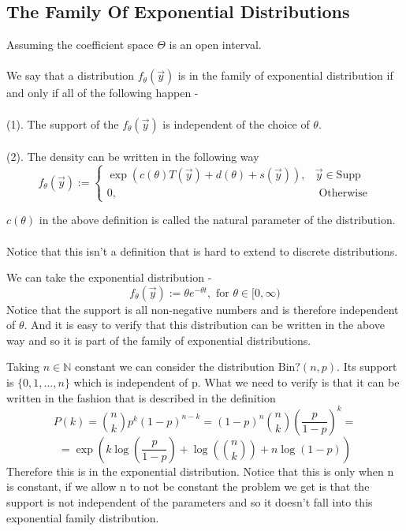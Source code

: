 \documentclass[../main.tex]{subfiles}
\begin{document}
\subsection{The Family Of Exponential Distributions}
\begin{definition}
Assuming the coefficient space $\Theta$ is an open interval. \\\\
We say that a distribution $f_\theta(\overrightarrow{y})$ is in the family of exponential distribution if and only if all of the following happen - \\\\
(1). The support of the $f_\theta(\overrightarrow{y})$ is independent of the choice of $\theta$. \\\\
(2). The density can be written in the following way
\[f_\theta(\overrightarrow{y}) := \begin{cases} \exp(c(\theta)T(\overrightarrow{y})+d(\theta)+ s(\overrightarrow{y})) , & \overrightarrow{y}\in\text{Supp} \\ 0 , & \text{ Otherwise}\end{cases}\]
\end{definition}
$c(\theta)$ in the above definition is called the natural parameter of the distribution. \\\\
Notice that this isn't a definition that is hard to extend to discrete distributions. \newpage
\begin{example}
We can take the exponential distribution -
\[f_\theta(\overrightarrow{y}):= \theta e^{-\theta t}, \text{ for } \theta\in [0,\infty)\]
Notice that the support is all non-negative numbers and is therefore independent of $\theta$. And it is easy to verify that this distribution can be written in the above way and so it is part of the family of exponential distributions. 
\end{example}
\begin{example}
Taking $n\in\mathbb{N}$ constant we can consider the distribution $\text{Bin}?(n,p)$. Its support is $\{0,1,\dots, n\}$ which is independent of p. What we need to verify is that it can be written in the fashion that is described in the definition
\[P(k)=\binom{n}{k} p^k\left(1-p\right)^{n-k} = \left(1-p\right)^n\binom{n}{k} \left(\frac{p}{1-p}\right)^k = \]\[ = \exp\left(k\log\left(\frac{p}{1-p}\right)+\log\left(\binom{n}{k}\right)+n\log(1-p)\right)\]
Therefore this is in the exponential distribution. Notice that this is only when n is constant, if we allow n to not be constant the problem we get is that the support is not independent of the parameters and so it doesn't fall into this exponential family distribution. 
\end{example}
\end{document}
